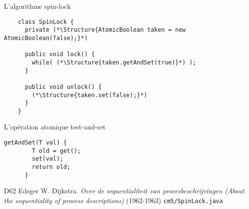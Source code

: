 
\begingroup

\begin{frame}[fragile]{L'algorithme spin-lock}

  \begin{lstlisting}
    class SpinLock {
      private (*\Structure{AtomicBoolean taken = new AtomicBoolean(false);}*)

      public void lock() {
        while( (*\Structure{taken.getAndSet(true)}*) );
      }

      public void unlock() {
        (*\Structure{taken.set(false);}*)
      }
    }
  \end{lstlisting}

  \begin{block}{L'opération \alert{atomique} test-and-set}
    \begin{lstlisting}[gobble=4]
      getAndSet(T val) {
        T old = get();
        set(val);
        return old;
      }
    \end{lstlisting}
  \end{block}

  
  \vFill
  \begin{citing}
  \item[D62] Edsger W. Dijkstra. \textit{Over de sequentialiteit van procesbeschrijvingen (About the sequentiality of process descriptions)} (1962-1963)
    \jitem \lstinline{cm5/SpinLock.java}
  \end{citing}
\end{frame}

\endgroup
\endinput
